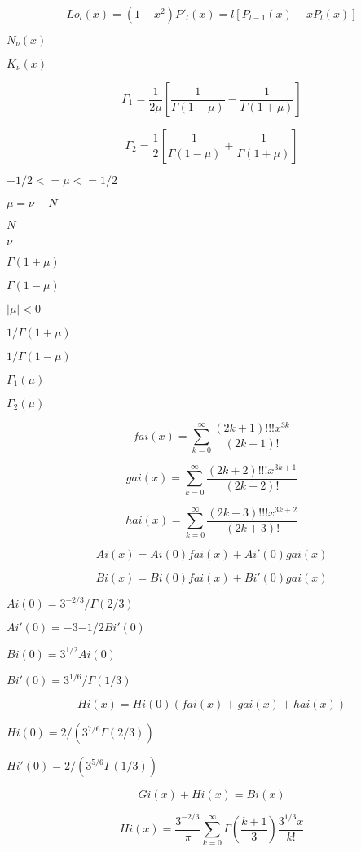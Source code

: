 \documentclass{article}
\begin{document}
\[ Lo_l(x) = (1 - x^2)P'_l(x) = l \left[ P_{l - 1}(x) - x P_l(x) \right] \]
\pagebreak

$ N_\nu(x) $
\pagebreak

$ K_\nu(x) $
\pagebreak

\[ \Gamma_1 = \frac{1}{2\mu} \left[\frac{1}{\Gamma(1 - \mu)} - \frac{1}{\Gamma(1 + \mu)}\right] \]
\pagebreak

\[ \Gamma_2 = \frac{1}{2} \left[\frac{1}{\Gamma(1 - \mu)} + \frac{1}{\Gamma(1 + \mu)}\right] \]
\pagebreak

$ -1/2 <= \mu <= 1/2 $
\pagebreak

$ \mu = \nu - N $
\pagebreak

$ N $
\pagebreak

$ \nu $
\pagebreak

$ \Gamma(1 + \mu) $
\pagebreak

$ \Gamma(1 - \mu) $
\pagebreak

$ |\mu| < 0 $
\pagebreak

$ 1/\Gamma(1 + \mu) $
\pagebreak

$ 1/\Gamma(1 - \mu) $
\pagebreak

$ \Gamma_1(\mu) $
\pagebreak

$ \Gamma_2(\mu) $
\pagebreak

\[ fai(x) = \sum_{k=0}^\infty \frac{(2k+1)!!!x^{3k}}{(2k+1)!} \]
\pagebreak

\[ gai(x) = \sum_{k=0}^\infty \frac{(2k+2)!!!x^{3k+1}}{(2k+2)!} \]
\pagebreak

\[ hai(x) = \sum_{k=0}^\infty \frac{(2k+3)!!!x^{3k+2}}{(2k+3)!} \]
\pagebreak

\[ Ai(x) = Ai(0)fai(x) + Ai'(0)gai(x) \]
\pagebreak

\[ Bi(x) = Bi(0)fai(x) + Bi'(0)gai(x) \]
\pagebreak

$ Ai(0) = 3^{-2/3}/\Gamma(2/3) $
\pagebreak

$ Ai'(0) = -3{-1/2}Bi'(0) $
\pagebreak

$ Bi(0) = 3^{1/2}Ai(0) $
\pagebreak

$ Bi'(0) = 3^{1/6}/\Gamma(1/3) $
\pagebreak

\[ Hi(x) = Hi(0)\left(fai(x) + gai(x) + hai(x)\right) \]
\pagebreak

$ Hi(0) = 2/(3^{7/6}\Gamma(2/3)) $
\pagebreak

$ Hi'(0) = 2/(3^{5/6}\Gamma(1/3)) $
\pagebreak

\[ Gi(x) + Hi(x) = Bi(x) \]
\pagebreak

\[ Hi(x) = \frac{3^{-2/3}}{\pi} \sum_{k=0}^\infty \Gamma\left(\frac{k+1}{3}\right) \frac{3^{1/3}x}{k!} \]
\pagebreak
\end{document}
